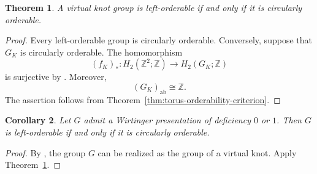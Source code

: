 \documentclass[10pt]{amsart}
\newtheorem{theorem}{Theorem}[section]
\newtheorem{corollary}[theorem]{Corollary}
\renewcommand{\*}{\cdot {\dots} \cdot}
\newcommand{\?}[1]{\overset{?}{#1}}
\numberwithin{equation}{section}
\begin{document}
\begin{theorem}\label{thm:virtual-knot-orderability}
A virtual knot group is left-orderable if and only if it is
circularly orderable.
\end{theorem}

\begin{proof}
Every left-orderable group is circularly orderable. Conversely,
suppose that $G_K$ is circularly orderable. The homomorphism
\[
(f_K)_*\colon
H_2(\mathbb Z^2;\mathbb Z)
\longrightarrow H_2(G_K;\mathbb Z)
\]
is surjective by \cite[Theorem~16]{Kim2000}. Moreover,
\[
(G_K)_{\mathrm{ab}}\cong\mathbb Z.
\]
The assertion follows from
Theorem~\ref{thm:torus-orderability-criterion}.
\end{proof}

\begin{corollary}\label{cor:wirtinger-orderability}
Let $G$ admit a Wirtinger presentation of deficiency $0$ or
$1$. Then $G$ is left-orderable if and only if it is
circularly orderable.
\end{corollary}

\begin{proof}
By \cite[Theorem~3]{Kim2000}, the group $G$ can be realized
as the group of a virtual knot. Apply
Theorem~\ref{thm:virtual-knot-orderability}.
\end{proof}






\printbibliography
\end{document}
